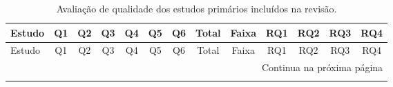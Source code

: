 \begin{scriptsize}
\setlength{\tabcolsep}{3pt}
\begin{longtable}{|p{3cm}|c|c|c|c|c|c|c|c|c|c|c|c|}
\caption{Avaliação de qualidade dos estudos primários incluídos na revisão.}
\label{apendice:qualidade} \\
\hline
Estudo & Q1 & Q2 & Q3 & Q4 & Q5 & Q6 & Total & Faixa & RQ1 & RQ2 & RQ3 & RQ4 \\
\hline
\endfirsthead
\hline
Estudo & Q1 & Q2 & Q3 & Q4 & Q5 & Q6 & Total & Faixa & RQ1 & RQ2 & RQ3 & RQ4 \\
\hline
\endhead
\hline
\multicolumn{13}{r}{\scriptsize Continua na próxima página} \\
\endfoot
\hline
\endlastfoot



\end{longtable}
\end{scriptsize}
